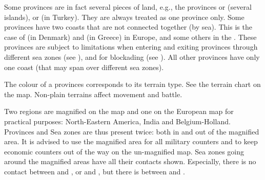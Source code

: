 \label{chBasics:Disconnected Provinces} Some
provinces are in fact several pieces of land, e.g., the provinces
\provinceCyclades or \provinceBaleares (several islands), or
\provinceCanakkale (in Turkey). They are always treated as one province only.
\label{chBasics:Multiple Coasts} Some provinces
have two coasts that are not connected together (by sea). This is the case of
\provinceSlesvig (in Denmark) and \provinceHellas (in Greece) in Europe, and
some others in the \ROTW. These provinces are subject to limitations when
entering and exiting provinces through different sea zones (see
), and for blockading (see
).
\bparag All other provinces have only one coast (that may span over different
sea zones).

\aparag[Terrain] The colour of a provinces corresponds to its terrain
type. See the terrain chart on the map. Non-plain terrains affect movement and
battle.

\aparag Two regions are magnified on the \ROTW map and one on the European map
for practical purposes: North-Eastern America, India and Belgium-Holland.
\bparag Provinces and Sea zones are thus present twice: both in and out of the
magnified area. It is advised to use the magnified area for all military
counters and to keep economic counters out of the way on the un-magnified map.
\bparag Sea zones going around the magnified areas have all their contacts
shown. Especially, there is no contact between \seazoneMaldives and
, or \seazoneQuarantiemes and \seazoneIndien, but there is
between \seazoneQuarantiemes and .

